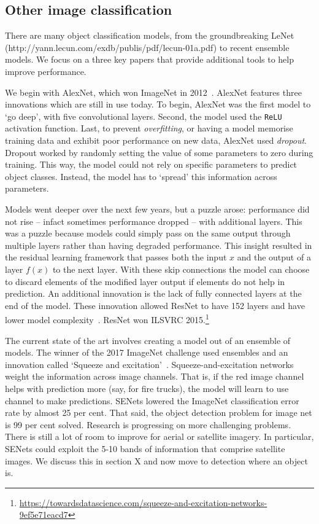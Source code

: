 \documentclass[12pt, a4paper, oneside, headinclude, footinclude]{article}
\begin{document}
\subsection{Other image classification}

There are many object classification models, from the groundbreaking LeNet
(http://yann.lecun.com/exdb/publis/pdf/lecun-01a.pdf) to recent ensemble
models. We focus on a three key papers that provide additional tools to help
improve performance.

We begin with AlexNet, which won ImageNet in 2012~\cite{NIPS2012_4824}.
AlexNet features three innovations which are still in use today. To begin,
AlexNet was the first model to `go deep', with five convolutional layers.
Second, the model used the \texttt{ReLU} activation function. Last, to prevent
\textit{overfitting}, or having a model memorise training data and exhibit
poor performance on new data, AlexNet used \textit{dropout}. Dropout worked by
randomly setting the value of some parameters to zero during training. This
way, the model could not rely on specific parameters to predict object
classes. Instead, the model has to `spread' this information across
parameters.

Models went deeper over the next few years, but a puzzle arose: performance
did not rise -- infact sometimes performance dropped -- with additional
layers. This was a puzzle because models could simply pass on the same output
through multiple layers rather than having degraded performance. This insight
resulted in the residual learning framework that passes both the input $x$ and
the output of a layer $f(x)$ to the next layer. With these skip connections
the model can choose to discard elements of the modified layer output if
elements do not help in prediction. An additional innovation is the lack of
fully connected layers at the end of the model. These innovation allowed ResNet
to have 152 layers and have lower model complexity~\cite{he2016deep}. ResNet
won ILSVRC
2015.\footnote{\url{https://towardsdatascience.com/squeeze-and-excitation-networks-9ef5e71eacd7}}

The current state of the art involves creating a model out of an ensemble of
models. The winner of the 2017 ImageNet challenge used ensembles and an
innovation called `Squeeze and excitation'~\cite{wmw}. Squeeze-and-excitation
networks weight the information across image channels. That is, if the red
image channel helps with prediction more (say, for fire trucks), the model
will learn to use channel to make predictions. SENets lowered the ImageNet
classification error rate by almost 25 per cent.  That said, the object
detection problem for image net is 99 per cent solved.  Research is
progressing on more challenging problems. There is still a lot of room to
improve for aerial or satellite imagery. In particular, SENets could exploit
the 5-10 bands of information that comprise satellite images. We discuss this
in section X and now move to detection where an object is.
\end{document}
